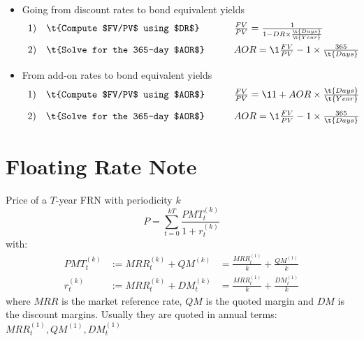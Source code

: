 \documentclass[12pt,article]{memoir}
\begin{document}
\begin{itemize}

	\item Going from discount rates to bond equivalent yields 
$$\begin{array}{lllllll}
1) & \t{Compute $FV/PV$ using $DR$} &&&  \frac{FV}{PV}=\frac{1}{1- DR \times \frac{\t{Days}}{\t{Year}}}
\\[1em]
2) & \t{Solve for the 365-day $AOR$} &&& AOR = \1{\frac{FV}{PV}-1}\times\frac{365}{\t{Days}}
\end{array}$$

	\item From add-on rates to bond equivalent yields
$$\begin{array}{lllllll}
1) & \t{Compute $FV/PV$ using $AOR$} &&&  \frac{FV}{PV} =  \1{1+AOR\times\frac{\t{Days}}{\t{Year}}}
\\[1em]
2) & \t{Solve for the 365-day $AOR$} &&& AOR = \1{\frac{FV}{PV}-1}\times\frac{365}{\t{Days}}
\end{array}$$

\end{itemize}





\section{Floating Rate Note}
Price of a $T$-year FRN with periodicity $k$
$$
P = \sum_{t=0}^{kT} \frac{PMT_t^{(k)}}{1+r_t^{(k)}}
$$
with:
$$\begin{array}{rlll}
PMT_t^{(k)} &:= MRR_t^{(k)} + QM^{(k)} &= \frac{MRR_t^{(1)}}{k} + \frac{QM^{(1)}}{k}
\\[0.7em]
r_t^{(k)}   &:= MRR_t^{(k)} + DM_t^{(k)} &= \frac{MRR_t^{(1)}}{k} + \frac{DM_t^{(1)}}{k}
\end{array}$$
where $MRR$ is the market reference rate, $QM$ is the quoted margin and $DM$ is the discount margins. Usually they are quoted in annual terms: $MRR_t^{(1)}, QM^{(1)}, DM_t^{(1)}$
\end{document}
